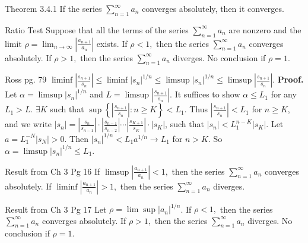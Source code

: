 \documentclass[10pt,landscape]{article}
\theoremstyle{definition}
\newcommand{\thistheoremname}{}
\newtheorem*{genericthm*}{\thistheoremname}
\newenvironment{namedthm*}[1]
{\renewcommand{\thistheoremname}{#1}\begin{genericthm*}}
{\end{genericthm*}}
\begin{document}
\begin{multicols}{3}
	\begin{namedthm*}{Theorem 3.4.1}
		If the series \(\sum_{n=1}^{\infty} a_{n}\) converges absolutely, then it converges.
	\end{namedthm*}

	\begin{namedthm*}{Ratio Test}
		Suppose that all the terms of the series \(\sum_{n=1}^{\infty} a_{n}\) are nonzero and the limit \(\rho=\lim _{n \rightarrow \infty}\left|\frac{a_{n+1}}{a_{n}}\right|\) exists. If \(\rho<1,\) then the series \(\sum_{n=1}^{\infty} a_{n}\) converges absolutely. If \(\rho>1,\) then the series \(\sum_{n=1}^{\infty} a_{n}\) diverges. No conclusion if \(\rho=1\).
	\end{namedthm*}
	\begin{namedthm*}{Ross pg. 79}
		\(\liminf \left|\frac{s_{n+1}}{s_{n}}\right| \leq \liminf \left|s_{n}\right|^{1 / n} \leq \limsup \left|s_{n}\right|^{1 / n} \leq \limsup \left|\frac{s_{n+1}}{s_{n}}\right|\). \textbf{Proof.} Let \(\alpha=\limsup \left|s_{n}\right|^{1 / n}\) and \(L=\limsup \left|\frac{s_{n+1}}{s_{n}}\right|\). It suffices to show  \(\alpha \leq L_{1}\) for any \(L_{1}>L\). \(\exists K\) such that \(\sup \left\{\left|\frac{s_{n+1}}{s_{n}}\right|: n \geq K\right\}<L_{1}\). Thus \(\left|\frac{s_{n+1}}{s_{n}}\right|<L_{1}\) for \(n \geq K\), and we write \(\left|s_{n}\right|=\left|\frac{s_{n}}{s_{n-1}}\right| \cdot\left|\frac{s_{n-1}}{s_{n-2}}\right| \cdots\left|\frac{s_{K+1}}{s_{K}}\right| \cdot\left|s_{K}\right|\), such that \(\left|s_{n}\right|<L_{1}^{n-K}\left|s_{K}\right|\). Let \(a=L_{1}^{-N}\left|s_{N}\right| > 0\). Then \(\left|s_{n}\right|^{1 / n}<L_{1} a^{1 / n} \rightarrow L_1\) for \(n>K\). So \(\alpha=\limsup \left|s_{n}\right|^{1 / n} \leq L_{1}\).
	\end{namedthm*}

	\begin{namedthm*}{Result from Ch 3 Pg 16}
		If  \(\limsup\left|\frac{a_{n+1}}{a_{n}}\right|<1,\) then the series \(\sum_{n=1}^{\infty} a_{n}\) converges absolutely. If  \(\liminf\left|\frac{a_{n+1}}{a_{n}}\right|>1,\) then the series \(\sum_{n=1}^{\infty} a_{n}\) diverges.
	\end{namedthm*}

	\begin{namedthm*}{Result from Ch 3 Pg 17}
		Let \(\rho=\lim \sup \left|a_{n}\right|^{1 / n}\). If \(\rho<1,\) then the series \(\sum_{n=1}^{\infty} a_{n}\) converges absolutely. If \(\rho>1,\) then the series \(\sum_{n=1}^{\infty} a_{n}\) diverges. No conclusion if \(\rho=1\).
	\end{namedthm*}


\end{multicols}
\end{document}
